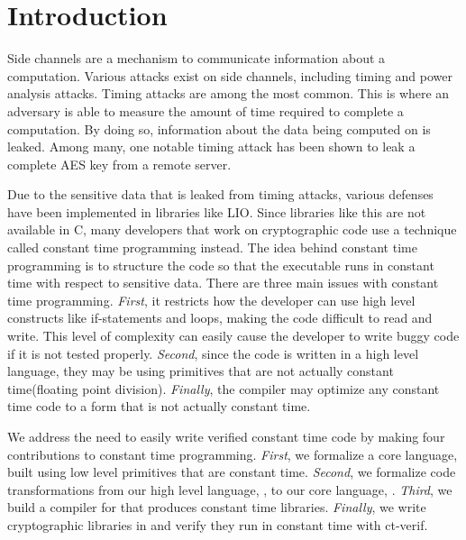 \section{Introduction}
Side channels are a mechanism to communicate information about a computation. Various attacks exist on side channels, including timing and power analysis attacks. Timing attacks are among the most common. This is where an adversary is able to measure the amount of time required to complete a computation. By doing so, information about the data being computed on is leaked. Among many, one notable timing attack has been shown to leak a complete AES key from a remote server\cite{brumley2005remote}.

Due to the sensitive data that is leaked from timing attacks, various defenses have been implemented in libraries like LIO\cite{stefan2012}. Since libraries like this are not available in C, many developers that work on cryptographic code use a technique called constant time programming instead. The idea behind constant time programming is to structure the code so that the executable runs in constant time with respect to sensitive data. There are three main issues with constant time programming. \textit{First}, it restricts how the developer can use high level constructs like if-statements and loops, making the code difficult to read and write. This level of complexity can easily cause the developer to write buggy code if it is not tested properly. \textit{Second}, since the code is written in a high level language, they may be using primitives that are not actually constant time(\eg floating point division). \textit{Finally}, the compiler may optimize any constant time code to a form that is not actually constant time.

We address the need to easily write verified constant time code by making four contributions to constant time programming. \textit{First}, we formalize a core language, built using low level primitives that are constant time. \textit{Second}, we formalize code transformations from our high level language, \constc, to our core language, \ccore. \textit{Third}, we build a compiler for \constc that produces constant time libraries. \textit{Finally}, we write cryptographic libraries in \constc and verify they run in constant time with ct-verif\cite{almeida2016}.




